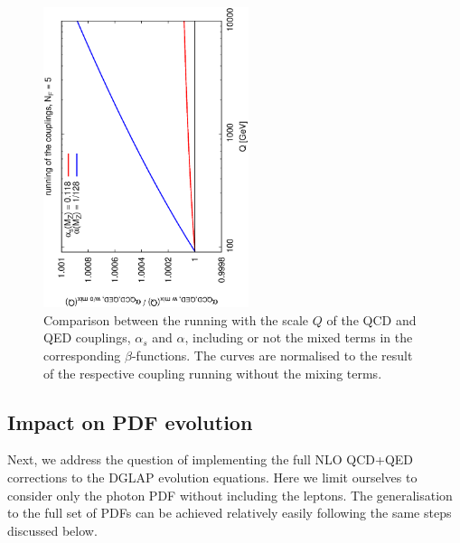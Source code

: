 \begin{figure}[h]
\includegraphics[width=6cm,angle=270]{figs/couplings.eps} 
\caption{Comparison between the running with the scale
$Q$ of the QCD and QED couplings,
  $\alpha_s$ and $\alpha$, including or not the mixed terms in
  the corresponding $\beta$-functions.
%
The curves are normalised to the result of the respective coupling
  running without the mixing terms.}
\label{fig:CouplingEvol}
\end{figure}

\subsection{Impact on PDF evolution}

Next, we address the question of implementing the full NLO
QCD+QED corrections to the DGLAP evolution equations. Here we limit
ourselves to consider only the photon PDF without including the
leptons. The generalisation to the full set of PDFs can be achieved
relatively easily following the same steps discussed below.

